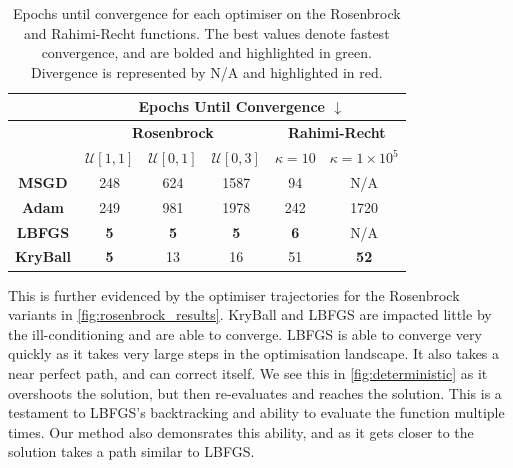 \begin{table}[!t]
    \caption{Epochs until convergence for each optimiser on the Rosenbrock and Rahimi-Recht functions. The best values denote fastest convergence, and are bolded and highlighted in green. Divergence is represented by N/A and highlighted in red.}
    \label{fig:task_1_convergence_table}
    \begin{tabular}{cccccc}
    \hline
    \multicolumn{1}{l}{} & \multicolumn{5}{c}{\textbf{Epochs Until Convergence $\downarrow$}}                                                                                                                                   \\ \hline
                         & \multicolumn{3}{c}{\textbf{Rosenbrock}}                                                                      & \multicolumn{2}{c}{\textbf{Rahimi-Recht}}                                \\
                         & \textbf{$\mathcal{U}[1,1]$}                & \textbf{$\mathcal{U}[0,1]$}                & \textbf{$\mathcal{U}[0,3]$}                & \textbf{$\kappa = 10$}                      & \textbf{$\kappa = 1 \times 10^5$}                      \\ \hline
    \textbf{MSGD}        & 248                                & 624                                & 1587                               & \cellcolor[HTML]{FFFFFF}94         & \cellcolor[HTML]{FD6864}N/A         \\
    \textbf{Adam}        & 249                                & 981                                & 1978                               & 242                                & \cellcolor[HTML]{FFFFFF}1720        \\ \hline
    \textbf{LBFGS}       & \cellcolor[HTML]{34FF34}\textbf{5} & \cellcolor[HTML]{34FF34}\textbf{5} & \cellcolor[HTML]{34FF34}\textbf{5} & \cellcolor[HTML]{34FF34}\textbf{6} & \cellcolor[HTML]{FD6864}N/A         \\
    \textbf{KryBall}     & \cellcolor[HTML]{34FF34}\textbf{5} & 13                                 & 16                                 & 51                                 & \cellcolor[HTML]{34FF34}\textbf{52} \\ \hline
    \end{tabular}
\end{table}

This is further evidenced by the optimiser trajectories for the Rosenbrock variants in \cref{fig:rosenbrock_results}. KryBall and LBFGS are impacted little by the ill-conditioning and are able to converge. LBFGS is able to converge very quickly as it takes very large steps in the optimisation landscape. It also takes a near perfect path, and can correct itself. We see this in \cref{fig:deterministic} as it overshoots the solution, but then re-evaluates and reaches the solution. This is a testament to LBFGS's backtracking and ability to evaluate the function multiple times. Our method also demonsrates this ability, and as it gets closer to the solution takes a path similar to LBFGS.

